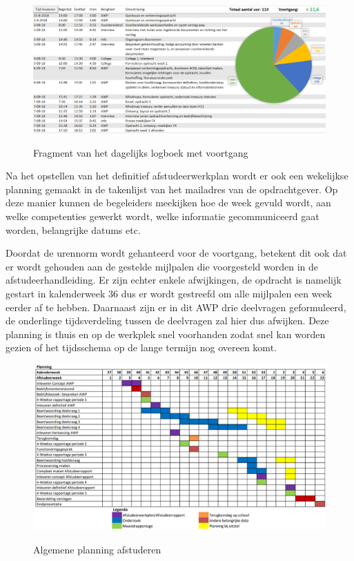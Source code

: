 \documentclass[10pt,a4paper,oneside]{report}
\begin{document}
\begin{figure}[h]
    \centering
    \includegraphics[angle=0,width=\textwidth]{logboek}
    \label{fig:logboek}
    \caption{Fragment van het dagelijks logboek met voortgang}
\end{figure}

Na het opstellen van het definitief afstudeerwerkplan wordt er ook een wekelijkse planning gemaakt in de takenlijst van het mailadres van de opdrachtgever. Op deze manier kunnen de begeleiders meekijken hoe de week gevuld wordt, aan welke competenties gewerkt wordt, welke informatie gecommuniceerd gaat worden, belangrijke datums etc.

\newpage
Doordat de urennorm wordt gehanteerd voor de voortgang, betekent dit ook dat er wordt gehouden aan de gestelde mijlpalen die voorgesteld worden in de afstudeerhandleiding. Er zijn echter enkele afwijkingen, de opdracht is namelijk gestart in kalenderweek 36 dus er wordt gestreefd om alle mijlpalen een week eerder af te hebben. Daarnaast zijn er in dit AWP drie deelvragen geformuleerd, de onderlinge tijdsverdeling tussen de deelvragen zal hier dus afwijken. Deze planning is thuis en op de werkplek snel voorhanden zodat snel kan worden gezien of het tijdsschema op de lange termijn nog overeen komt.

\begin{figure}[!ht]
    \centering
    \includegraphics[angle=0,width=\textwidth]{planning}
    \label{fig:planning}
    \caption{Algemene planning afstuderen}
\end{figure}
\end{document}
